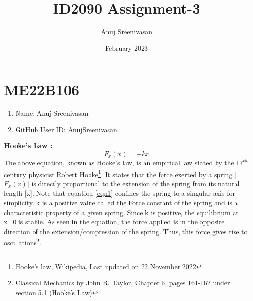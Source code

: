 \documentclass{article}
\title{ID2090 Assignment-3}
\author{Anuj Sreenivasan}
\date{February 2023}
\begin{document}
\maketitle

\section{ME22B106}
\begin{enumerate}
    \item Name: Anuj Sreenivasan
    \item GitHub User ID: AnujSreenivasan
\end{enumerate}

\textbf{\large{Hooke's Law :}}
\begin{equation}
    F_{x}(x) = -kx
\label{eqn1}
\end{equation}
The above equation, known as Hooke's law, is an empirical law stated by 
the $17^{th}$ century physicist Robert Hooke\footnote{Hooke's law,
Wikipedia, Last updated on 22 November 2022}. It states that the force 
exerted by a spring [$F_{x}(x)$] is directly proportional to the extension 
of the spring from its natural length [x]. Note that equation \ref{eqn1} 
confines the spring to a singular axis for simplicity. k is a positive 
value called the Force constant of the spring and is a characteristic 
property of a given spring. Since k is positive, the equilibrium at x=0 is 
stable. As seen in the equation, the force applied is in the opposite 
direction of the extension/compression of the spring. Thus, this force 
gives rise to oscillations\footnote{Classical Mechanics by John R. Taylor, 
Chapter 5, pages 161-162 under section 5.1 (Hooke's Law)}. 
\end{document}
